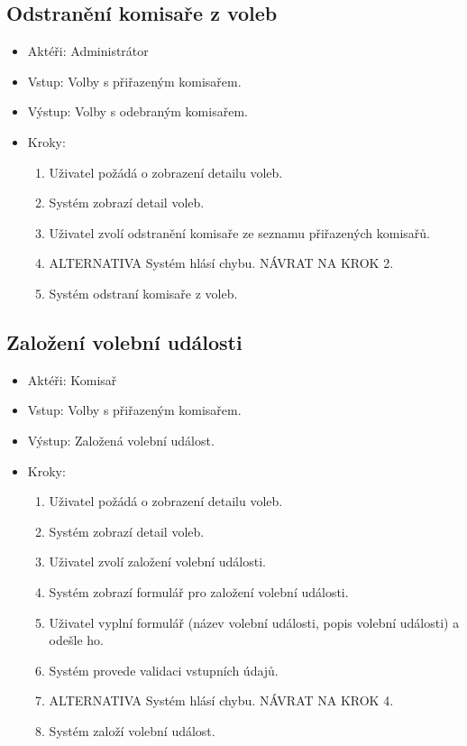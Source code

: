 \documentclass[11pt,twoside,a4paper]{book}
\begin{document}
\subsection{Odstranění komisaře z voleb}

\begin{itemize}
\item Aktéři: Administrátor
\item Vstup: Volby s přiřazeným komisařem.
\item Výstup: Volby s odebraným komisařem.
\item Kroky:
	\begin{enumerate}
		\item Uživatel požádá o zobrazení detailu voleb.
		\item Systém zobrazí detail voleb.
		\item Uživatel zvolí odstranění komisaře ze seznamu přiřazených komisařů.		
		\item ALTERNATIVA Systém hlásí chybu. NÁVRAT NA KROK 2.
		\item Systém odstraní komisaře z voleb.
	\end{enumerate}
\end{itemize}

\subsection{Založení volební události}

\begin{itemize}
\item Aktéři: Komisař
\item Vstup: Volby s přiřazeným komisařem.
\item Výstup: Založená volební událost.
\item Kroky:
	\begin{enumerate}
		\item Uživatel požádá o zobrazení detailu voleb.
		\item Systém zobrazí detail voleb.
		\item Uživatel zvolí založení volební události.
		\item Systém zobrazí formulář pro založení volební události.
		\item Uživatel vyplní formulář (název volební události, popis volební události) a odešle ho.
		\item Systém provede validaci vstupních údajů.
		\item ALTERNATIVA Systém hlásí chybu. NÁVRAT NA KROK 4.
		\item Systém založí volební událost.
	\end{enumerate}
\end{itemize}
\end{document}
